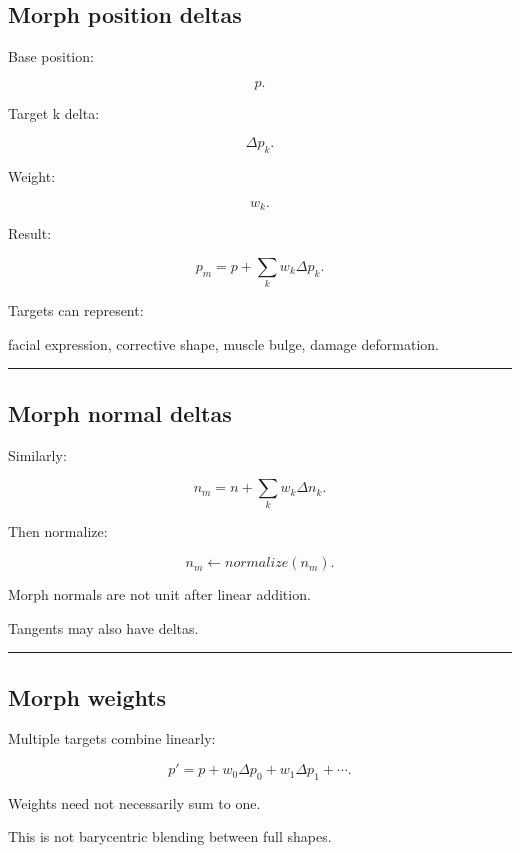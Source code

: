 \subsection{Morph position deltas}\label{04-visual-computing-ii-ch041-morph-position-deltas}

Base position:

\[
p.
\]

Target k delta:

\[
\Delta p_k.
\]

Weight:

\[
w_k.
\]

Result:

\[
\boxed{
p_m
=
p+
\sum_kw_k\Delta p_k.
}
\]

Targets can represent:

facial expression, corrective shape, muscle bulge, damage deformation.

\begin{center}\rule{0.5\linewidth}{0.5pt}\end{center}

\subsection{Morph normal deltas}\label{04-visual-computing-ii-ch041-morph-normal-deltas}

Similarly:

\[
n_m=
n+
\sum_kw_k\Delta n_k.
\]

Then normalize:

\[
\boxed{
n_m\leftarrow
normalize(n_m).
}
\]

Morph normals are not unit after linear addition.

Tangents may also have deltas.

\begin{center}\rule{0.5\linewidth}{0.5pt}\end{center}

\subsection{Morph weights}\label{04-visual-computing-ii-ch041-morph-weights}

Multiple targets combine linearly:

\[
p'
=
p+
w_0\Delta p_0
+
w_1\Delta p_1
+\cdots.
\]

Weights need not necessarily sum to one.

This is not barycentric blending between full shapes.

